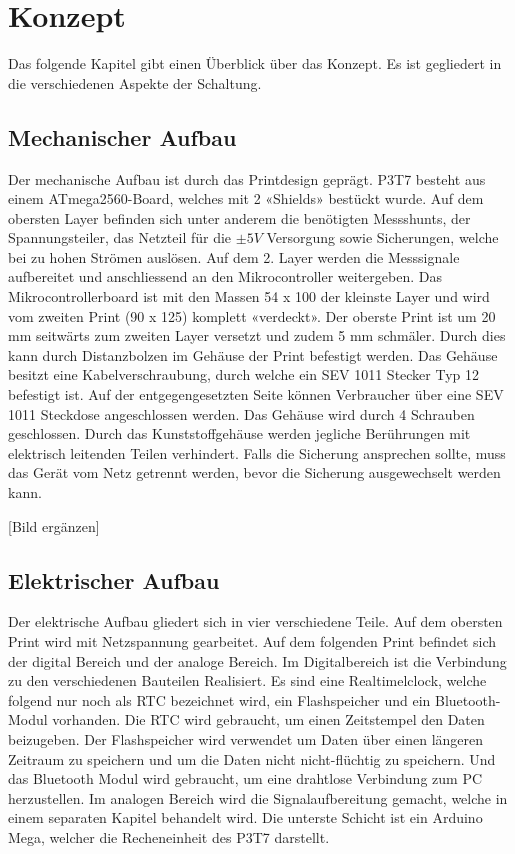 \section{Konzept}
Das folgende Kapitel gibt einen Überblick über das Konzept. Es ist gegliedert in die verschiedenen Aspekte der Schaltung.
\subsection{Mechanischer Aufbau}
Der mechanische Aufbau ist durch das Printdesign geprägt. P3T7 besteht aus einem ATmega2560-Board, welches mit 2 «Shields» bestückt wurde. Auf dem obersten Layer befinden sich unter anderem die benötigten Messshunts, der Spannungsteiler, das Netzteil für die $\pm 5V$ Versorgung sowie Sicherungen, welche bei zu hohen Strömen auslösen. Auf dem 2. Layer werden die Messsignale aufbereitet und anschliessend an den Mikrocontroller weitergeben. Das Mikrocontrollerboard ist mit den Massen 54 x 100 der kleinste Layer und wird vom zweiten Print (90 x 125) komplett «verdeckt». Der oberste Print ist um 20 mm seitwärts zum zweiten Layer versetzt und zudem 5 mm schmäler. Durch dies kann durch Distanzbolzen im Gehäuse der Print befestigt werden. Das Gehäuse besitzt eine Kabelverschraubung, durch welche ein SEV 1011 Stecker Typ 12 befestigt ist. Auf der entgegengesetzten Seite können Verbraucher über eine SEV 1011 Steckdose angeschlossen werden.
Das Gehäuse wird durch 4 Schrauben geschlossen. Durch das Kunststoffgehäuse werden jegliche Berührungen mit elektrisch leitenden Teilen verhindert. Falls die Sicherung ansprechen sollte, muss das Gerät vom Netz getrennt werden, bevor die Sicherung ausgewechselt werden kann. 


[Bild ergänzen]

\subsection{Elektrischer Aufbau}
Der elektrische Aufbau gliedert sich in vier verschiedene Teile. Auf dem obersten Print wird mit Netzspannung gearbeitet. Auf dem folgenden Print befindet sich der digital Bereich und der analoge Bereich. Im Digitalbereich ist die Verbindung zu den verschiedenen Bauteilen Realisiert. Es sind eine Realtimelclock, welche folgend nur noch als RTC bezeichnet wird, ein Flashspeicher und ein Bluetooth-Modul vorhanden. Die RTC wird gebraucht, um einen Zeitstempel den Daten beizugeben. Der Flashspeicher wird verwendet um Daten über einen längeren Zeitraum zu speichern und um die Daten nicht nicht-flüchtig zu speichern. Und das Bluetooth Modul wird gebraucht, um eine drahtlose Verbindung zum PC herzustellen. Im analogen Bereich wird die Signalaufbereitung gemacht, welche in einem separaten Kapitel behandelt wird. Die unterste Schicht ist ein Arduino Mega, welcher die Recheneinheit des P3T7 darstellt.

